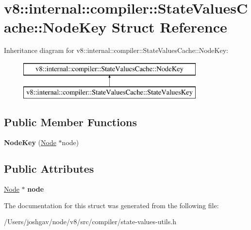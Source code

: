 \hypertarget{structv8_1_1internal_1_1compiler_1_1_state_values_cache_1_1_node_key}{}\section{v8\+:\+:internal\+:\+:compiler\+:\+:State\+Values\+Cache\+:\+:Node\+Key Struct Reference}
\label{structv8_1_1internal_1_1compiler_1_1_state_values_cache_1_1_node_key}
Inheritance diagram for v8\+:\+:internal\+:\+:compiler\+:\+:State\+Values\+Cache\+:\+:Node\+Key\+:\begin{figure}[H]
\begin{center}
\leavevmode
\includegraphics[height=2.000000cm]{structv8_1_1internal_1_1compiler_1_1_state_values_cache_1_1_node_key}
\end{center}
\end{figure}
\subsection*{Public Member Functions}
\begin{DoxyCompactItemize}
\item 
{\bfseries Node\+Key} (\hyperlink{classv8_1_1internal_1_1compiler_1_1_node}{Node} $\ast$node)\hypertarget{structv8_1_1internal_1_1compiler_1_1_state_values_cache_1_1_node_key_a4ffd4530436ec1c2a20fe73bb9075322}{}\label{structv8_1_1internal_1_1compiler_1_1_state_values_cache_1_1_node_key_a4ffd4530436ec1c2a20fe73bb9075322}

\end{DoxyCompactItemize}
\subsection*{Public Attributes}
\begin{DoxyCompactItemize}
\item 
\hyperlink{classv8_1_1internal_1_1compiler_1_1_node}{Node} $\ast$ {\bfseries node}\hypertarget{structv8_1_1internal_1_1compiler_1_1_state_values_cache_1_1_node_key_af02bc04f0b96cc2ef9d74e14667b6f90}{}\label{structv8_1_1internal_1_1compiler_1_1_state_values_cache_1_1_node_key_af02bc04f0b96cc2ef9d74e14667b6f90}

\end{DoxyCompactItemize}


The documentation for this struct was generated from the following file\+:\begin{DoxyCompactItemize}
\item 
/\+Users/joshgav/node/v8/src/compiler/state-\/values-\/utils.\+h\end{DoxyCompactItemize}
